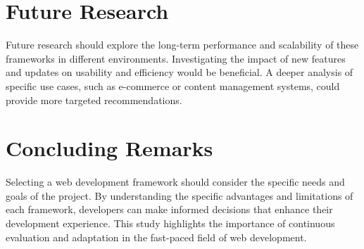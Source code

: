 \section{Future Research}

Future research should explore the long-term performance and scalability of these frameworks in different environments. Investigating the impact of new features and updates on usability and efficiency would be beneficial. A deeper analysis of specific use cases, such as e-commerce or content management systems, could provide more targeted recommendations.

\section{Concluding Remarks}

Selecting a web development framework should consider the specific needs and goals of the project. By understanding the specific advantages and limitations of each framework, developers can make informed decisions that enhance their development experience. This study highlights the importance of continuous evaluation and adaptation in the fast-paced field of web development.